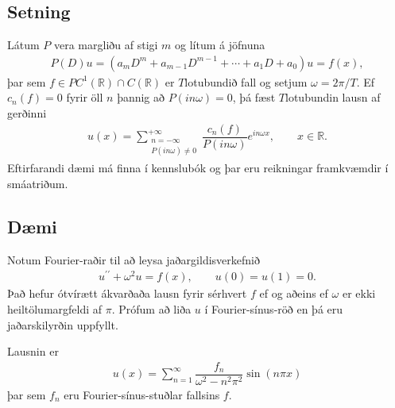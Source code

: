 \documentclass[a4paper,10pt,icelandic]{sphinxmanual}
\begin{document}
\subsection{Setning}
\label{\detokenize{Kafli02:id6}}
Látum \(P\) vera margliðu af stigi \(m\) og lítum á jöfnuna
\begin{equation*}
\begin{split}P(D)u=(a_mD^m+a_{m-1}D^{m-1}+\cdots+a_1 D +a_0)u=f(x),\end{split}
\end{equation*}
þar sem \(f\in PC^1({{\mathbb  R}})\cap C({{\mathbb  R}})\) er
\(T\)\textendash{}lotubundið fall og setjum \(\omega=2\pi/T\). Ef
\(c_n(f)=0\) fyrir öll \(n\) þannig að \(P(in\omega)=0\), þá
fæst \(T\)\textendash{}lotubundin lausn af gerðinni
\begin{equation*}
\begin{split}u(x)=\sum_{\substack{n=-\infty\\ P(in\omega)\neq 0}}^{+\infty}
 \dfrac{c_n(f)} {P(in\omega)} e^{in\omega x}, \qquad x\in {{\mathbb  R}}.\end{split}
\end{equation*}
Eftirfarandi dæmi má finna í kennslubók og þar eru reikningar framkvæmdir í smáatriðum.


\subsection{Dæmi}
\label{\detokenize{Kafli02:daemi}}
Notum Fourier-raðir til að leysa jaðargildisverkefnið
\begin{equation*}
\begin{split}u{{^{\prime\prime}}}+{\omega}^2 u=f(x), \qquad u(0)=u(1)=0.\end{split}
\end{equation*}
Það hefur ótvírætt ákvarðaða lausn fyrir sérhvert \(f\) ef og aðeins ef \({\omega}\) er ekki
heiltölumargfeldi af \({\pi}\). Prófum að liða \(u\) í Fourier-sínus-röð en þá eru jaðarskilyrðin uppfyllt.

Lausnin er
\begin{equation*}
\begin{split}u(x)=\sum\limits_{n=1}^{\infty} \dfrac{f_n}{{\omega}^2-n^2{\pi}^2}
 \sin (n{\pi}x)\end{split}
\end{equation*}
þar sem \(f_n\) eru Fourier-sínus-stuðlar fallsins \(f\).
\end{document}
